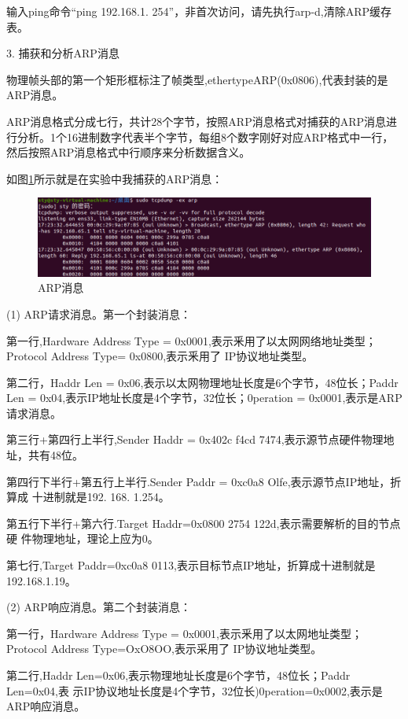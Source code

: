 \documentclass[lang=cn,11pt,a4paper,cite=authoryear]{elegantpaper}
\begin{document}
输入ping命令“ping 192.168.1. 254”，非首次访问，请先执行arp-d,清除ARP缓存表。

3.	捕获和分析ARP消息

物理帧头部的第一个矩形框标注了帧类型,ethertypeARP(0x0806),代表封装的是ARP消息。

ARP消息格式分成七行，共计28个字节，按照ARP消息格式对捕获的ARP消息进行分析。1个16进制数字代表半个字节，每组8个数字刚好对应ARP格式中一行，然后按照ARP消息格式中行顺序来分析数据含义。

如图\ref{fig:arp}所示就是在实验中我捕获的ARP消息：

\begin{figure}[htbp]
	\centering
	\includegraphics[width=\linewidth]{image/arp}
	\caption{ARP消息}
	\label{fig:arp}
\end{figure}



(1)	ARP请求消息。第一个封装消息：

第一行,Hardware Address Type = 0x0001,表示釆用了以太网网络地址类型；Protocol Address Type= 0x0800,表示釆用了 IP协议地址类型。

第二行，Haddr Len = 0x06,表示以太网物理地址长度是6个字节，48位长；Paddr Len = 0x04,表示IP地址长度是4个字节，32位长；0peration = 0x0001,表示是ARP请求消息。

第三行+第四行上半行,Sender Haddr = 0x402c f4cd 7474,表示源节点硬件物理地址，共有48位。

第四行下半行+第五行上半行.Sender Paddr = 0xc0a8 Olfe,表示源节点IP地址，折算成 十进制就是192. 168. 1.254。

第五行下半行+第六行.Target Haddr=0x0800 2754 122d,表示需要解析的目的节点硬 件物理地址，理论上应为0。

第七行,Target Paddr=0xc0a8 0113,表示目标节点IP地址，折算成十进制就是192.168.1.19。

(2)	ARP响应消息。第二个封装消息：

第一行，Hardware Address Type = 0x0001,表示釆用了以太网地址类型；Protocol
Address Type=OxO8OO,表示采用了 IP协议地址类型。

第二行,Haddr Len=0x06,表示物理地址长度是6个字节，48位长；Paddr Len=0x04,表 示IP协议地址长度是4个字节，32位长)0peration=0x0002,表示是ARP响应消息。
\end{document}
